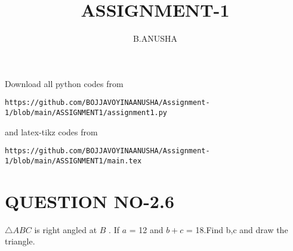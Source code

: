 \documentclass[journal,12pt,twocolumn]{IEEEtran}
\begin{document}
     \def\rightbox#1{\makebox[0in][r]{#1}}
     \def\centbox#1{\makebox[0in]{#1}}
     \def\topbox#1{\raisebox{-\baselineskip}[0in][0in]{#1}}
     \def\midbox#1{\raisebox{-0.5\baselineskip}[0in][0in]{#1}}
\vspace{3cm}
\title{ASSIGNMENT-1}
\author{B.ANUSHA}
\maketitle
\newpage
\bigskip
\renewcommand{\thefigure}{\theenumi}
\renewcommand{\thetable}{\theenumi}
Download all python codes from 
\begin{lstlisting}
https://github.com/BOJJAVOYINAANUSHA/Assignment-1/blob/main/ASSIGNMENT1/assignment1.py
\end{lstlisting}
%
and latex-tikz codes from 
\begin{lstlisting}
https://github.com/BOJJAVOYINAANUSHA/Assignment-1/blob/main/ASSIGNMENT1/main.tex
\end{lstlisting}
%
\section{QUESTION NO-2.6}
$\triangle ABC$ is right angled at $B$ . If $a$ = 12 and $b+c$ = 18.Find b,c and draw the triangle.
%
\end{document}
